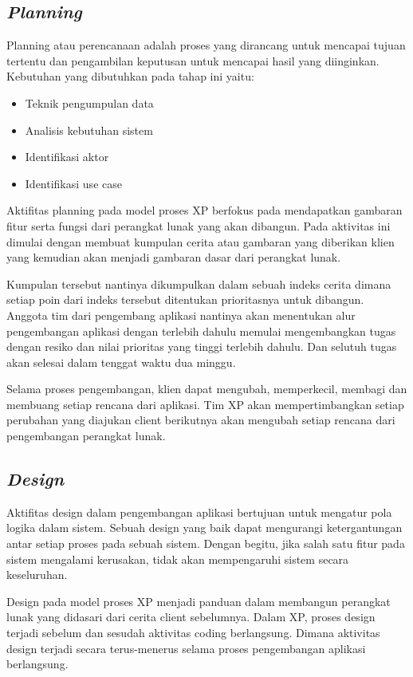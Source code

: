 \subsection{\textit{Planning}}
Planning atau perencanaan adalah proses yang dirancang untuk mencapai tujuan tertentu dan pengambilan keputusan untuk mencapai hasil yang diinginkan. Kebutuhan yang dibutuhkan pada tahap ini yaitu:
\begin {itemize}
	\itemsep0em
	\item Teknik pengumpulan data
	\item Analisis kebutuhan sistem
	\item Identifikasi aktor
	\item Identifikasi use case
\end {itemize}
\par Aktifitas planning pada model proses XP berfokus pada mendapatkan gambaran fitur serta fungsi dari perangkat lunak yang akan dibangun. Pada aktivitas ini dimulai dengan membuat kumpulan cerita atau gambaran yang diberikan klien yang kemudian akan menjadi gambaran dasar dari perangkat lunak.
\par Kumpulan tersebut nantinya dikumpulkan dalam sebuah indeks cerita dimana setiap poin dari indeks tersebut ditentukan prioritasnya untuk dibangun. Anggota tim dari pengembang aplikasi nantinya akan menentukan alur pengembangan aplikasi dengan terlebih dahulu memulai mengembangkan tugas dengan resiko dan nilai prioritas yang tinggi terlebih dahulu. Dan selutuh tugas akan selesai dalam tenggat waktu dua minggu.
\par Selama proses pengembangan, klien dapat mengubah, memperkecil, membagi dan membuang setiap rencana dari aplikasi. Tim XP akan mempertimbangkan setiap perubahan yang diajukan client berikutnya akan mengubah setiap rencana dari pengembangan perangkat lunak.

\subsection{\emph{Design}}
\par Aktifitas design dalam pengembangan aplikasi bertujuan untuk mengatur pola logika dalam sistem. Sebuah design yang baik dapat mengurangi ketergantungan antar setiap proses pada sebuah sistem. Dengan begitu, jika salah satu fitur pada sistem mengalami kerusakan, tidak akan mempengaruhi sistem secara keseluruhan.
\par Design pada model proses XP menjadi panduan dalam membangun perangkat lunak yang didasari dari cerita client sebelumnya. Dalam XP, proses design terjadi sebelum dan sesudah aktivitas coding berlangsung. Dimana aktivitas design terjadi secara terus-menerus selama proses pengembangan aplikasi berlangsung.

